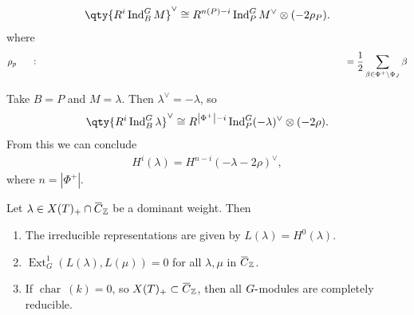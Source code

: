 \begin{theorem}

\begin{theorem}

\begin{align*}   \qty{ R^i \operatorname{Ind}_B^G M }^\vee\cong R^{n(P) -i} \operatorname{Ind}_P^G M^\vee\otimes(-2\rho_P) .\end{align*}
where
\begin{align*} \rho_p \mathrel{\vcenter{:}}={1\over 2}\sum_{\beta \in \Phi^+ \setminus\Phi_J} \beta \end{align*}

\end{theorem}

\end{theorem}

\begin{example}

\begin{example}

Take \(B = P\) and \(M = \lambda\). Then \(\lambda ^\vee= -\lambda\), so
\begin{align*}   \qty{ R^i \operatorname{Ind}_B^G \lambda }^\vee\cong R^{{\left\lvert {\Phi^+} \right\rvert} -i} \operatorname{Ind}_P^G (- \lambda) ^\vee\otimes(-2\rho) .\end{align*}
From this we can conclude
\begin{align*}   H^i(\lambda) = H^{n-i} (-\lambda - 2\rho)^\vee ,\end{align*}
where \(n = {\left\lvert {\Phi^+} \right\rvert}\).

\end{example}

\end{example}

\begin{corollary}[?]

\begin{corollary}[?]

Let
\(\lambda \in X(T)_+ \cap\mkern 1.5mu\overline{\mkern-1.5muC\mkern-1.5mu}\mkern 1.5mu_{\mathbb{Z}}\)
be a dominant weight. Then

\begin{enumerate}
\def\labelenumi{\alph{enumi}.}
\item
  The irreducible representations are given by
  \(L(\lambda) = H^0(\lambda)\).
\item
  \(\operatorname{Ext}_G^1(L(\lambda), L(\mu)) = 0\) for all
  \(\lambda, \mu\) in
  \(\mkern 1.5mu\overline{\mkern-1.5muC\mkern-1.5mu}\mkern 1.5mu_{\mathbb{Z}}\).
\item
  If \(\operatorname{char}~(k) = 0\), so
  \(X(T)_+ \subset \mkern 1.5mu\overline{\mkern-1.5muC\mkern-1.5mu}\mkern 1.5mu_{\mathbb{Z}}\),
  then all \(G{\hbox{-}}\)modules are completely reducible.
\end{enumerate}

\end{corollary}

\end{corollary}

